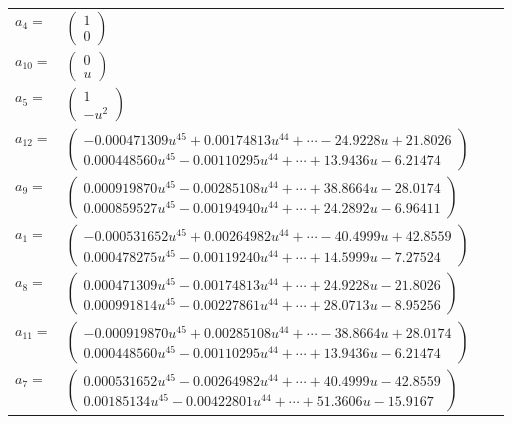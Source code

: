 \documentclass[1p]{elsarticle_modified}
\theoremstyle{definition}
\begin{document}
\begin{tabular}{m{7pt} m{180pt} m{7pt} m{180pt} }
\flushright $a_{4}=$&$\begin{pmatrix}1\\0\end{pmatrix}$ \\
\flushright $a_{10}=$&$\begin{pmatrix}0\\u\end{pmatrix}$ \\
\flushright $a_{5}=$&$\begin{pmatrix}1\\- u^2\end{pmatrix}$ \\
\flushright $a_{12}=$&$\begin{pmatrix}-0.000471309 u^{45}+0.00174813 u^{44}+\cdots-24.9228 u+21.8026\\0.000448560 u^{45}-0.00110295 u^{44}+\cdots+13.9436 u-6.21474\end{pmatrix}$ \\
\flushright $a_{9}=$&$\begin{pmatrix}0.000919870 u^{45}-0.00285108 u^{44}+\cdots+38.8664 u-28.0174\\0.000859527 u^{45}-0.00194940 u^{44}+\cdots+24.2892 u-6.96411\end{pmatrix}$ \\
\flushright $a_{1}=$&$\begin{pmatrix}-0.000531652 u^{45}+0.00264982 u^{44}+\cdots-40.4999 u+42.8559\\0.000478275 u^{45}-0.00119240 u^{44}+\cdots+14.5999 u-7.27524\end{pmatrix}$ \\
\flushright $a_{8}=$&$\begin{pmatrix}0.000471309 u^{45}-0.00174813 u^{44}+\cdots+24.9228 u-21.8026\\0.000991814 u^{45}-0.00227861 u^{44}+\cdots+28.0713 u-8.95256\end{pmatrix}$ \\
\flushright $a_{11}=$&$\begin{pmatrix}-0.000919870 u^{45}+0.00285108 u^{44}+\cdots-38.8664 u+28.0174\\0.000448560 u^{45}-0.00110295 u^{44}+\cdots+13.9436 u-6.21474\end{pmatrix}$ \\
\flushright $a_{7}=$&$\begin{pmatrix}0.000531652 u^{45}-0.00264982 u^{44}+\cdots+40.4999 u-42.8559\\0.00185134 u^{45}-0.00422801 u^{44}+\cdots+51.3606 u-15.9167\end{pmatrix}$ \\

\end{tabular}
\end{document}
